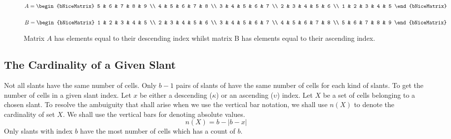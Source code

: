 \documentclass[letterpaper, twoside,12pt]{article}
\begin{document}
    \begin{figure}[ht]
        \centering
        \begin{minipage}{0.45\textwidth}
            \centering
            {$
            A =
            \begin{bNiceMatrix}
                5 & 6 & 7 & 8 & 9 \\
                4 & 5 & 6 & 7 & 8 \\
                3 & 4 & 5 & 6 & 7 \\
                2 & 3 & 4 & 5 & 6 \\
                1 & 2 & 3 & 4 & 5
            \end{bNiceMatrix}
            $}
        \end{minipage}
        \hfill
        \begin{minipage}{0.45\textwidth}
            \centering
            {$
            B =
            \begin{bNiceMatrix}
                1 & 2 & 3 & 4 & 5 \\
                2 & 3 & 4 & 5 & 6 \\
                3 & 4 & 5 & 6 & 7 \\
                4 & 5 & 6 & 7 & 8 \\
                5 & 6 & 7 & 8 & 9
            \end{bNiceMatrix}
            $}
        \end{minipage}
        \caption{Matrix $A$ has elements equal to their descending index whilst matrix B has elements equal to their ascending index.}
    \end{figure}

    \subsection{The Cardinality of a Given Slant} \label{slant_cardinality}
    Not all slants have the same number of cells. Only $b-1$ pairs of slants of have the same number of cells for each kind of slants. To get the number of cells in a given slant index. Let $x$ be either a descending ($\kappa$) or an ascending ($\upsilon$) index. Let $X$ be a set of cells belonging to a chosen slant. To resolve the ambuiguity that shall arise when we use the vertical bar notation, we shall use $n(X)$ to denote the cardinality of set $X$. We shall use the vertical bars for denoting absolute values.
    \begin{equation}
        n(X) = b - |b - x|
    \end{equation}
    Only slants with index $b$ have the most number of cells which has a count of $b$.
\end{document}

